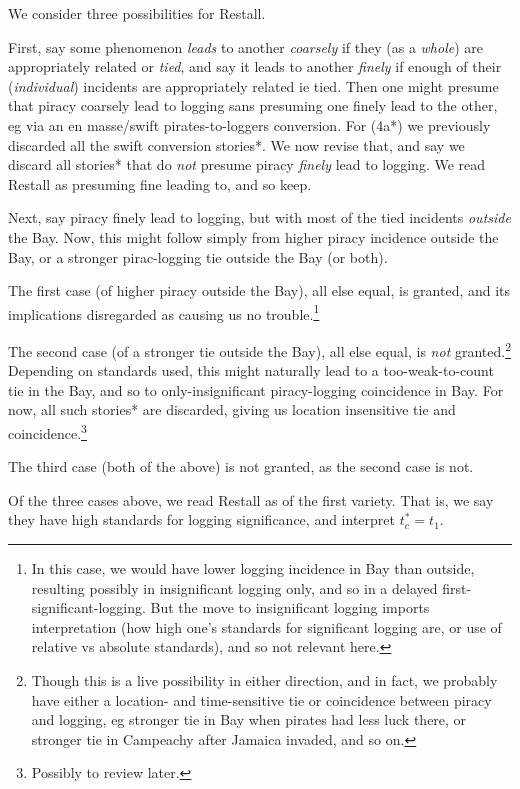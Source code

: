 \documentclass{amsart}
\newcommand{\ment}{\textit} %
\theoremstyle{definition}
\theoremstyle{remark}
\begin{document}
		We consider three possibilities for Restall. 
		
		First, say some phenomenon \ment{leads} to another \ment{coarsely} if they (as a \emph{whole}) are appropriately related or \ment{tied}, and say it leads to another \ment{finely} if enough of their (\emph{individual}) incidents are appropriately related ie tied. Then one might presume that piracy coarsely lead to logging sans presuming one finely lead to the other, eg via an en masse/swift pirates-to-loggers conversion. For (4a*) we previously discarded all the swift conversion stories*. We now revise that, and say we discard all stories* that do \emph{not} presume piracy \emph{finely} lead to logging. We read Restall as presuming fine leading to, and so keep.
		
		Next, say piracy finely lead to logging, but with most of the tied incidents \emph{outside} the Bay. Now, this might follow simply from higher piracy incidence outside the Bay, or a stronger pirac-logging tie outside the Bay (or both).
		
		The first case (of higher piracy outside the Bay), all else equal, is granted, and its implications disregarded as causing us no trouble.\footnote{In this case, we would have lower logging incidence in Bay than outside, resulting possibly in insignificant logging only, and so in a delayed first-significant-logging. But the move to insignificant logging imports interpretation (how high one's standards for significant logging are, or use of relative vs absolute standards), and so not relevant here.}
		
		The second case (of a stronger tie outside the Bay), all else equal, is \emph{not} granted.\footnote{Though this is a live possibility in either direction, and in fact, we probably have either a location- and time-sensitive tie or coincidence between piracy and logging, eg stronger tie in Bay when pirates had less luck there, or stronger tie in Campeachy after Jamaica invaded, and so on.} Depending on standards used, this might naturally lead to a too-weak-to-count tie in the Bay, and so to only-insignificant piracy-logging coincidence in Bay. For now, all such stories* are discarded, giving us location insensitive tie and coincidence.\footnote{Possibly to review later.}
		
		The third case (both of the above) is not granted, as the second case is not.
		
		Of the three cases above, we read Restall as of the first variety. That is, we say they have high standards for logging significance, and interpret \(t_c^*=t_1\).
		
\end{document}
